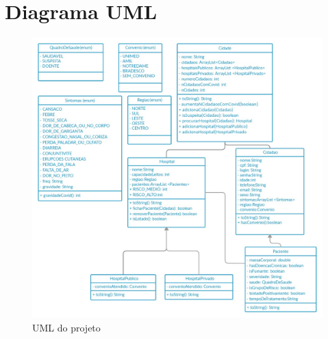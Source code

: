 \documentclass[10pt]{article}
\begin{document}
\section{Diagrama UML}

\begin{figure}[H]
	\centering	
    \includegraphics[width = .90\textwidth]{uml.jpg}
    \caption{UML do projeto}
\end{figure}
\end{document}
